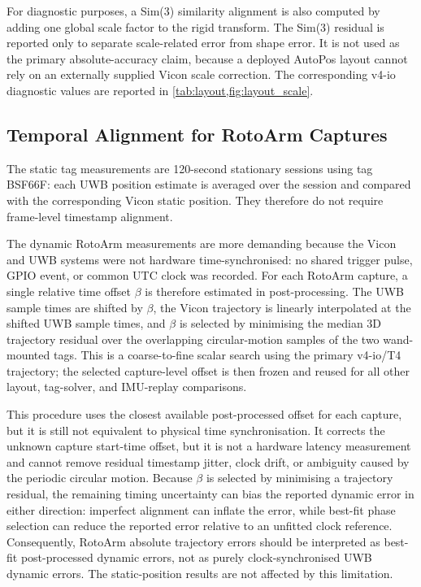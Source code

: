 \documentclass[11pt,a4paper]{article}
\begin{document}
For diagnostic purposes, a Sim(3) similarity alignment is also computed by adding one global scale factor to the rigid transform.
The Sim(3) residual is reported only to separate scale-related error from shape error.
It is not used as the primary absolute-accuracy claim, because a deployed AutoPos layout cannot rely on an externally supplied Vicon scale correction.
The corresponding v4-io diagnostic values are reported in \cref{tab:layout,fig:layout_scale}.

\subsection{Temporal Alignment for RotoArm Captures}
\label{sec:coord_temporal}

The static tag measurements are 120-second stationary sessions using tag BSF66F: each UWB position estimate is averaged over the session and compared with the corresponding Vicon static position.
They therefore do not require frame-level timestamp alignment.

The dynamic RotoArm measurements are more demanding because the Vicon and UWB systems were not hardware time-synchronised: no shared trigger pulse, GPIO event, or common UTC clock was recorded.
For each RotoArm capture, a single relative time offset $\beta$ is therefore estimated in post-processing.
The UWB sample times are shifted by $\beta$, the Vicon trajectory is linearly interpolated at the shifted UWB sample times, and $\beta$ is selected by minimising the median 3D trajectory residual over the overlapping circular-motion samples of the two wand-mounted tags.
This is a coarse-to-fine scalar search using the primary v4-io/T4 trajectory; the selected capture-level offset is then frozen and reused for all other layout, tag-solver, and IMU-replay comparisons.

This procedure uses the closest available post-processed offset for each capture, but it is still not equivalent to physical time synchronisation.
It corrects the unknown capture start-time offset, but it is not a hardware latency measurement and cannot remove residual timestamp jitter, clock drift, or ambiguity caused by the periodic circular motion.
Because $\beta$ is selected by minimising a trajectory residual, the remaining timing uncertainty can bias the reported dynamic error in either direction: imperfect alignment can inflate the error, while best-fit phase selection can reduce the reported error relative to an unfitted clock reference.
Consequently, RotoArm absolute trajectory errors should be interpreted as best-fit post-processed dynamic errors, not as purely clock-synchronised UWB dynamic errors.
The static-position results are not affected by this limitation.
\end{document}
